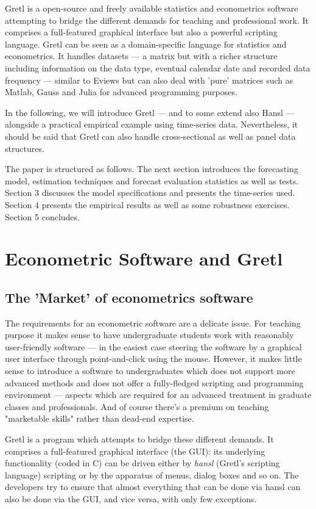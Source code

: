 \documentclass[11pt]{article}
\newcommand{\remph}[1]{{\color{myred}#1}}
\begin{document}
Gretl is a open-source and freely available statistics and econometrics software attempting to bridge the different demands for teaching and professional work. It comprises a full-featured graphical interface but also a powerful scripting language. Gretl can be seen as a domain-specific language for statistics and econometrics. It handles datasets --- a matrix but with a richer structure including information on the data type, eventual calendar date and recorded data frequency --- similar to Eviews but can also deal with 'pure' matrices such as Matlab, Gauss and Julia for advanced programming purposes.

In the following, we will introduce Gretl --- and to some extend also Hansl --- alongside a practical empirical example using time-series data. Nevertheless, it should be said that Gretl can also handle cross-sectional as well as panel data structures.

The paper is structured as follows. \remph{The next section introduces the forecasting model, estimation techniques and forecast evaluation statistics as well as tests. Section 3 discusses the model specifications and presents the time-series used. Section 4 presents the empirical results as well as some robustness exercises. Section 5 concludes.}


\section{Econometric Software and Gretl}

\subsection{The 'Market' of econometrics software}
The requirements for an econometric software are a delicate issue. For teaching purpose it makes sense to have undergraduate students work with reasonably user-friendly software --- in the easiest case steering the software by a graphical user interface through point-and-click using the mouse. However, it makes little sense to introduce a software to undergraduates which does not support more advanced methods and does not offer a fully-fledged scripting and programming environment --- aspects which are required for an advanced treatment in graduate classes and professionals. And of course there's a premium on teaching "marketable skills" rather than dead-end expertise.

Gretl is a program which attempts to bridge these different demands. It comprises a full-featured graphical interface (the GUI): its underlying
functionality (coded in C) can be driven either by \textit{hansl} (Gretl's scripting language) scripting or by the apparatus of menus, dialog boxes and so on. The developers try to ensure that almost everything that can be done via hansl can also be done via the GUI, and vice versa, with only few exceptions. 
\end{document}
